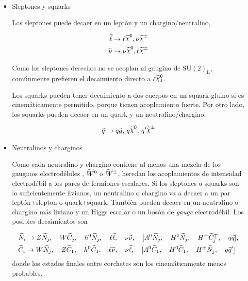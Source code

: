 \begin{itemize}\itemsep0.2cm\parskip0.2cm

\item Sleptones y squarks

  Los sleptones puede decaer en un leptón y un chargino/neutralino,

  \begin{align}
    \slepton &\to \ell \nino, \nu\chinopm \\
    \snu &\to \nu\nino, \ell\chinopm
  \end{align}

  Como los sleptones derechos no se acoplan al gaugino de $\text{SU}(2)_\text{L}$,
  comúnmente prefieren el decaimiento directo a $\ell\ninoone$.

  Los squarks pueden tener decaimiento a dos cuerpos en un squark-gluino si es
  cinemáticamente permitido, porque tienen acoplamiento fuerte. Por otro
  lado, los squarks pueden decaer en un quark y un neutralino/chargino.

  \begin{equation}
    \susy{q} \to q\gluino, \, q\nino, \, q^\prime \chinopm
  \end{equation}


\item Neutralinos y charginos

  Como cada neutralino y chargino contiene al menos una mezcla de los gauginos
  electrodébiles {\bino}, $\widetilde{W}^0$ o $\widetilde{W}^{\pm}$, heredan los
  acoplamientos de intensidad electrodébil a los pares de fermiones escalares. Si
  los sleptones o squarks son lo suficientemente livianos, un neutralino o
  chargino va a decaer a un par leptón+slepton o quark+squark. También pueden
  decaer en un neutralino o chargino más liviano y un Higgs escalar o un bosón
  de \emph{gauge} electrodébil. Los posibles decaimientos son

\begin{align}
  &\widetilde{N}_i \rightarrow Z \widetilde{N}_j, \quad W \widetilde{C}_j, \quad h^0 \widetilde{N}_j, \quad
  \ell \widetilde{\ell}, \quad \nu \widetilde{\nu}, \quad [A^0 \widetilde{N}_j, \quad H^0
    \widetilde{N}_j, \quad H^{\pm} \widetilde{C}_j^{\mp}, \quad q \widetilde{q}],
  \\ &\widetilde{C}_i \rightarrow W \widetilde{N}_j, \quad Z \widetilde{C}_1, \quad h^0 \widetilde{C}_1,
  \quad \ell \widetilde{\nu}, \quad \nu \widetilde{\ell}, \quad [A^0 \widetilde{C}_1, \quad H^0
    \widetilde{C}_1, \quad H^{\pm} \widetilde{N}_j, \quad q \widetilde{q}']
\end{align}
%
donde los estados finales entre corchetes son los cinemáticamente menos
probables.



\end{itemize}
